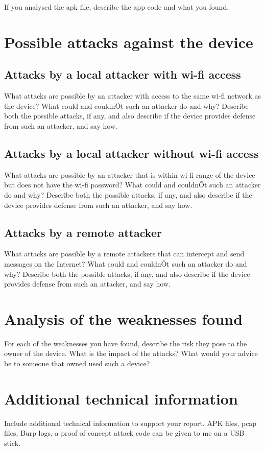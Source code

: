 \documentclass[11pt]{article}
\begin{document}
If you analysed the apk file, describe the app code and what you found.

\section{Possible attacks against the device}


\subsection{Attacks by a local attacker with wi-fi access}

What attacks are possible by an attacker with access to the same wi-fi network as the device? What could and couldnÕt such an attacker do and why? Describe both the possible attacks, if any, and also describe if the device provides defense from such an attacker, and say how. 

\subsection{Attacks by a local attacker without wi-fi access}

What attacks are possible by an attacker that is within wi-fi range of the device but does not have the wi-fi password? What could and couldnÕt such an attacker do and why? Describe both the possible attacks, if any, and also describe if the device provides defense from such an attacker, and say how. 

\subsection{Attacks by a remote attacker}

What attacks are possible by a remote attackers that can intercept and send messages on the Internet? What could and couldnÕt such an attacker do and why? Describe both the possible attacks, if any, and also describe if the device provides defense from such an attacker, and say how. 

\section{Analysis of the weaknesses found}

For each of the weaknesses you have found, describe the risk they pose to the owner of the device. What is the impact of the attacks? What would your advice be to someone that owned used such a device?


 
\appendix

\section{Additional technical information}

Include additional technical information to support your report. APK files, pcap files, Burp logs, a proof of concept attack code can be given to me on a USB stick.
\end{document}
